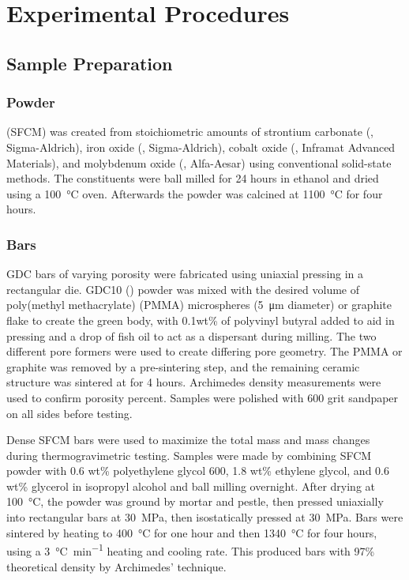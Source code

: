 


\chapter{Experimental Procedures}

\section{Sample Preparation}

    \subsection{ Powder}
         (SFCM) was created from stoichiometric amounts of strontium carbonate (, Sigma-Aldrich), iron oxide (, Sigma-Aldrich), cobalt oxide (, Inframat Advanced Materials), and molybdenum oxide (, Alfa-Aesar) using conventional solid-state methods.
        The constituents were ball milled for 24 hours in ethanol and dried using a \SI{100}{\celsius} oven.
        Afterwards the powder was calcined at \SI{1100}{\celsius} for four hours.

    \subsection{Bars}
        GDC bars of varying porosity were fabricated using uniaxial pressing in a rectangular die.
        GDC10 () powder was mixed with the desired volume of poly(methyl methacrylate) (PMMA) microspheres (\SI{5}{\micro\meter} diameter) or graphite flake to create the green body, with 0.1wt\% of polyvinyl butyral added to aid in pressing and a drop of fish oil to act as a dispersant during milling.
        The two different pore formers were used to create differing pore geometry.
        The PMMA or graphite was removed by a  pre-sintering step, and the remaining ceramic structure was sintered at  for 4 hours.
        Archimedes density measurements were used to confirm porosity percent.
        Samples were polished with 600 grit sandpaper on all sides before testing.

        Dense SFCM bars were used to maximize the total mass and mass changes during thermogravimetric testing.
        Samples were made by combining SFCM powder with 0.6 wt\% polyethylene glycol 600, 1.8 wt\% ethylene glycol, and 0.6 wt\% glycerol in isopropyl alcohol and ball milling overnight.
        After drying at \SI{100}{\celsius}, the powder was ground by mortar and pestle, then pressed uniaxially into rectangular bars at \SI{30}{\mega\pascal}, then isostatically pressed at \SI{30}{\mega\pascal}.
        Bars were sintered by heating to \SI{400}{\celsius} for one hour and then \SI{1340}{\celsius} for four hours, using a \SI{3}{\celsius\per\minute} heating and cooling rate.
        This produced bars with 97\% theoretical density by Archimedes' technique.

